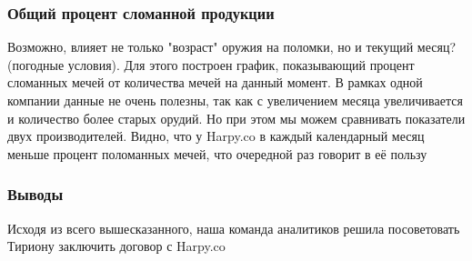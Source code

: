 \documentclass[8pt]{beamer}
\begin{document}
\begin{frame}
\frametitle{Общий процент сломанной продукции}
\begin{figure}[h]
\end{figure}
Возможно, влияет не только "возраст" оружия на поломки, но и текущий месяц?(погодные условия). Для этого построен график, показывающий процент сломанных мечей от количества мечей на данный момент. В рамках одной компании данные не очень полезны, так как с увеличением месяца увеличивается и количество более старых орудий. Но при этом мы можем сравнивать показатели двух производителей. Видно, что у Harpy.co в каждый календарный месяц меньше процент поломанных мечей, что очередной раз говорит в её пользу


\end{frame}
\begin{frame}
\frametitle{Выводы}
\begin{figure}[h]
\end{figure}
\bigskip
Исходя из всего вышесказанного, наша команда аналитиков решила посоветовать Тириону заключить договор с Harpy.co
\end{frame}
\end{document}
